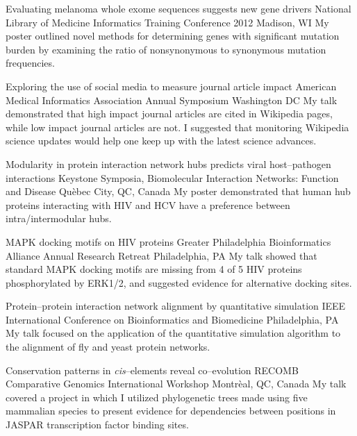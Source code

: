\documentclass [10pt, letterpaper]{moderncv}
\begin{document}
         {Evaluating melanoma whole exome sequences suggests new gene drivers}
         {National Library of Medicine Informatics Training Conference 2012}
         {Madison, WI}
         {}
         {My poster outlined novel methods for determining genes with significant mutation 
          burden by examining the ratio of nonsynonymous to synonymous mutation frequencies.}

         {Exploring the use of social media to measure journal article impact}
         {American Medical Informatics Association Annual Symposium}
         {Washington DC}
         {}
         {My talk demonstrated that high impact journal articles are cited in Wikipedia pages, 
          while low impact journal articles are not. I suggested that monitoring Wikipedia science 
          updates would help one keep up with the latest science advances.}

         {Modularity in protein interaction network hubs predicts
          viral host--pathogen interactions}
         {Keystone Symposia, Biomolecular Interaction Networks: Function
          and Disease}
         {Qu\`{e}bec City, QC, Canada}
         {}
         {My poster demonstrated that human hub proteins 
          interacting with HIV and HCV
          have a preference between intra/intermodular hubs.}

         {MAPK docking motifs on HIV proteins}
         {Greater Philadelphia Bioinformatics Alliance Annual Research Retreat}
         {Philadelphia, PA}
         {}
         {My talk showed that standard MAPK docking motifs are
          missing from 4 of 5 HIV proteins phosphorylated by ERK1/2, 
          and suggested evidence
          for alternative docking sites.}

         {Protein--protein interaction network alignment by quantitative
          simulation}
         {IEEE International Conference on Bioinformatics and 
          Biomedicine}
         {Philadelphia, PA}
         {}
         {My talk focused on the application of the 
          quantitative simulation algorithm to the 
          alignment of fly and yeast
          protein networks.}

         {Conservation patterns in
  \emph{cis}--elements reveal co--evolution} 
         {RECOMB Comparative
  Genomics International Workshop} 
         {Montr\`{e}al, QC, Canada} 
         {} 
         {My talk covered a project in which I utilized phylogenetic trees made
          using five
          mammalian species to present evidence for dependencies between
          positions in JASPAR transcription factor binding sites.}
\end{document}
